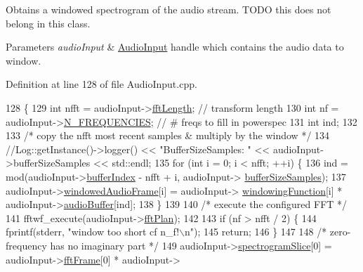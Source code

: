 Obtains a windowed spectrogram of the audio stream. T\+O\+DO this does not belong in this class. 
\begin{DoxyParams}{Parameters}
{\em audio\+Input} & \mbox{\hyperlink{classAudioInput}{Audio\+Input}} handle which contains the audio data to window. \\
\hline
\end{DoxyParams}


Definition at line 128 of file Audio\+Input.\+cpp.


\begin{DoxyCode}
128                                                                \{
129     \textcolor{keywordtype}{int} nfft = audioInput->\mbox{\hyperlink{classAudioInput_a5b31598e9106da62d86d11d69a9dbd20}{fftLength}};             \textcolor{comment}{// transform length}
130     \textcolor{keywordtype}{int} nf = audioInput->\mbox{\hyperlink{classAudioInput_a4be6c19fca6626b2ccee1eeca458f7c8}{N\_FREQUENCIES}};              \textcolor{comment}{// # freqs to fill in powerspec}
131     \textcolor{keywordtype}{int} ind;
132 
133     \textcolor{comment}{/* copy the nfft most recent samples & multiply by the window */}
134     \textcolor{comment}{//Log::getInstance()->logger() << "BufferSizeSamples: " << audioInput->bufferSizeSamples << std::endl;}
135     \textcolor{keywordflow}{for} (\textcolor{keywordtype}{int} i = 0; i < nfft; ++i) \{
136         ind = mod(audioInput->\mbox{\hyperlink{classAudioInput_a3c9888a90ca8bc6b42257f3f11ee9a6e}{bufferIndex}} - nfft + i, audioInput->
      \mbox{\hyperlink{classAudioInput_a4e213a9a22a62dccc3a54369101559c7}{bufferSizeSamples}});
137         audioInput->\mbox{\hyperlink{classAudioInput_ae5a196a9ba111b7aa1ef64db6f092432}{windowedAudioFrame}}[i] = audioInput->
      \mbox{\hyperlink{classAudioInput_a72417120c208d81359f5b1205fc06664}{windowingFunction}}[i] * audioInput->\mbox{\hyperlink{classAudioInput_a797943485896a381ea80947c8b6a8488}{audioBuffer}}[ind];
138     \}
139 
140     \textcolor{comment}{/* execute the configured FFT */}
141     fftwf\_execute(audioInput->\mbox{\hyperlink{classAudioInput_a9797094e75625173beae7e89497248b2}{fftPlan}});
142 
143     \textcolor{keywordflow}{if} (nf > nfft / 2) \{
144         fprintf(stderr, \textcolor{stringliteral}{"window too short cf n\_f!\(\backslash\)n"});
145         \textcolor{keywordflow}{return};
146     \}
147 
148     \textcolor{comment}{/* zero-frequency has no imaginary part */}
149     audioInput->\mbox{\hyperlink{classAudioInput_aa277accc3be5054fe8439ac7086deaf5}{spectrogramSlice}}[0] = audioInput->\mbox{\hyperlink{classAudioInput_a0c0e5c44a1547a97564e0733aaac2dc0}{fftFrame}}[0] * audioInput->

\end{DoxyCode}

